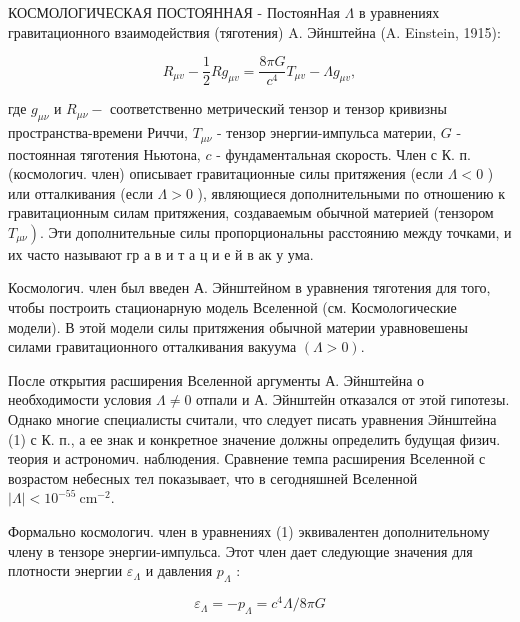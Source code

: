 \documentclass[10pt]{article}
\begin{document}
КОСМОЛОГИЧЕСКАЯ ПОСТОЯННАЯ - ПостоянНая $\Lambda$ в уравнениях гравитационного взаимодействия (тяготения) A. Эйнштейна (A. Einstein, 1915):



\[

R_{\mu v}-\frac{1}{2} R g_{\mu v}=\frac{8 \pi G}{c^{4}} T_{\mu v}-\Lambda g_{\mu v},

\]



где $g_{\mu \nu}$ и $R_{\mu \nu}-$ соответственно метрический тензор и тензор кривизны пространства-времени Риччи, $T_{\mu \nu}$ - тензор энергии-импульса материи, $G$ - постоянная тяготения Ньютона, $c$ - фундаментальная скорость. Член с К. п. (космологич. член) описывает гравитационные силы притяжения (если $\Lambda<0$ ) или отталкивания (если $\Lambda>0$ ), являющиеся дополнительными по отношению к гравитационным силам притяжения, создаваемым обычной материей (тензором $\left.T_{\mu \nu}\right)$. Эти дополнительные силы пропорциональны расстоянию между точками, и их часто называют гр а в и т а ц и е й в ак у ума.



Космологич. член был введен А. Эйнштейном в уравнения тяготения для того, чтобы построить стационарную модель Вселенной (см. Космологические модели). В этой модели силы притяжения обычной материи уравновешены силами гравитационного отталкивания вакуума $(\Lambda>0)$.



После открытия расширения Вселенной аргументы А. Эйнштейна о необходимости условия $\Lambda \neq 0$ отпали и А. Эйнштейн отказался от этой гипотезы. Однако многие специалисты считали, что следует писать уравнения Эйнштейна (1) с К. п., а ее знак и конкретное значение должны определить будущая физич. теория и астрономич. наблюдения. Сравнение темпа расширения Вселенной с возрастом небесных тел показывает, что в сегодняшней Вселенной $|\Lambda|<10^{-55} \mathrm{~cm}^{-2}$.



Формально космологич. член в уравнениях (1) эквивалентен дополнительному члену в тензоре энергии-импульса. Этот член дает следующие значения для плотности энергии $\varepsilon_{\Lambda}$ и давления $p_{\Lambda}$ :



\[

\varepsilon_{\Lambda}=-p_{\Lambda}=c^{4} \Lambda / 8 \pi G

\]
\end{document}
